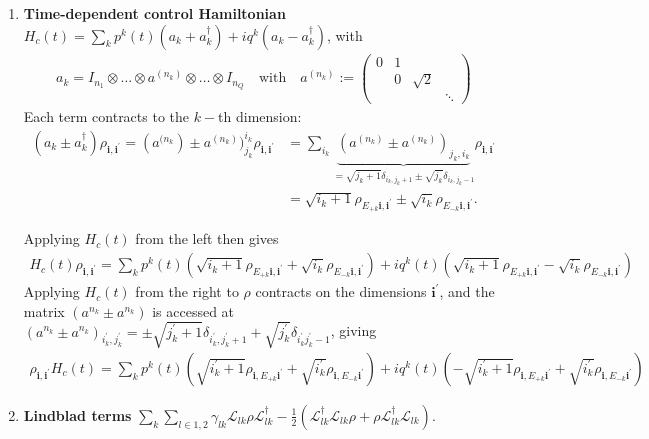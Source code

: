 \documentclass[letterpaper]{article}
\newcommand{\Ell}{\mathcal{L}}
\newcommand{\bfi}{\boldsymbol{i}}
\newcommand{\p}{\prime}
\begin{document}
\begin{enumerate}
    \item \textbf{Time-dependent control Hamiltonian} $H_c(t) = \sum_k p^k(t) (a_k + a_k^\dag) + iq^k(a_k - a_k^\dag)$, with  
      \begin{align}
      a_k = I_{n_1}\otimes \dots \otimes a^{(n_k)} \otimes \dots \otimes I_{n_Q} \quad \text{with} \quad a^{(n_k)} := \begin{pmatrix} 0 & 1 & \\ & 0 & \sqrt{2} \\ & & & \ddots \end{pmatrix}
      \end{align}
      Each term contracts to the $k-$th dimension:
      \begin{align}
        (a_k\pm a_k^\dag) \rho_{\bfi,\bfi^\p} = (a^{(n_k}) \pm a^{(n_k)})^{i_k}_{j_k} \rho_{\bfi,\bfi^\prime} &= \sum_{i_k} \underbrace{(a^{(n_k)} \pm a^{(n_k)})_{j_k,i_k}}_{= \sqrt{j_k+1} \delta_{i_k,j_k+1} \pm \sqrt{j_k} \delta_{i_k,j_k-1}} \rho_{\bfi, \bfi^{\prime}} \\
        &= \sqrt{i_k+1} \rho_{E_{+k}\bfi, \bfi^\prime} \pm \sqrt{i_k} \rho_{E_{-k}\bfi, \bfi^\prime}.
      \end{align} 

      Applying $H_c(t)$ from the left then gives 
      \begin{align}
        H_c(t) \rho_{\bfi, \bfi^\prime} = \sum_k p^k(t) \left(\sqrt{i_k+1} \rho_{E_{+k}\bfi,\bfi^\prime} + \sqrt{i_k} \rho_{E_{-k} \bfi,\bfi^\prime} \right) + iq^k(t) \left(\sqrt{i_k+1} \rho_{E_{+k}\bfi,\bfi^\prime} - \sqrt{i_k} \rho_{E_{-k}\bfi,\bfi^\prime} \right)
      \end{align}
      Applying $H_c(t)$ from the right to $\rho$ contracts on the dimensions $\bfi^\prime$, and the matrix $(a^{n_k } \pm a^{n_k})$ is accessed at $(a^{n_k } \pm a^{n_k})_{i_k^\prime,j_k^\prime} = \pm \sqrt{j_k^\prime+1} \delta_{i_k^\prime, j_k^\prime +1} + \sqrt{j_k^\prime} \delta_{i_k^\prime j_k^\prime -1}$, giving
      \begin{align}
        \rho_{\bfi, \bfi^\prime} H_c(t) = \sum_k p^k(t) \left(\sqrt{i_k^\prime+1} \rho_{\bfi,E_{+k}\bfi^\prime} + \sqrt{i_k^\prime} \rho_{\bfi,E_{-k}\bfi^\prime} \right) + iq^k(t) \left( - \sqrt{i_k^\prime+1} \rho_{\bfi,E_{+k}\bfi^\prime} + \sqrt{i_k^\prime} \rho_{\bfi,E_{-k}\bfi^\prime} \right)
      \end{align}

    \item \textbf{Lindblad terms} $\sum_k \sum_{l\in{1,2}} \gamma_{lk} \Ell_{lk} \rho \Ell_{lk}^\dag - \frac{1}{2} \left( \Ell_{lk}^\dag \Ell_{lk} \rho + \rho \Ell_{lk}^\dag \Ell_{lk}\right)$.
    

\end{enumerate}
\end{document}
